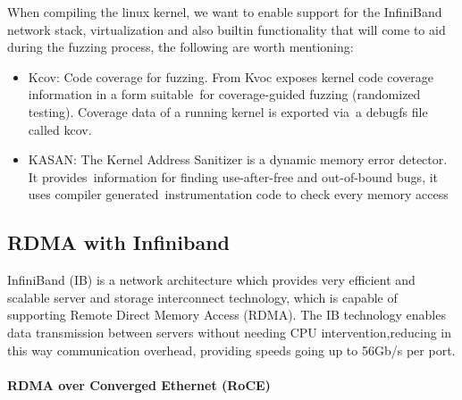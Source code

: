 When compiling the linux kernel, we want to enable support for the InfiniBand network stack, virtualization and 
also builtin functionality that will come to aid during the fuzzing process, the following are worth
mentioning:

\begin{itemize}
    \item Kcov: Code coverage for fuzzing. From \cite{kerneldocs-kcov} Kvoc exposes kernel code coverage information in a form suitable\
    for coverage-guided fuzzing (randomized testing). Coverage data of a running kernel is exported via\
    a debugfs file called kcov. %
    \item KASAN: The Kernel Address Sanitizer is a dynamic memory error detector. It provides\
    information for finding use-after-free and out-of-bound bugs, it uses compiler generated\
    instrumentation code to check every memory access \cite{kerneldocs-kasan} %
\end{itemize}



\subsection{RDMA with Infiniband}

InfiniBand (IB) is a network architecture which provides very efficient and scalable server and storage interconnect
technology, which is capable of supporting Remote Direct Memory Access (RDMA). The IB technology enables data 
transmission between servers without needing CPU intervention,reducing in this way communication overhead, providing 
speeds going up to 56Gb/s per port\cite{rdmamanual}.


\paragraph{RDMA over Converged Ethernet (RoCE)}

